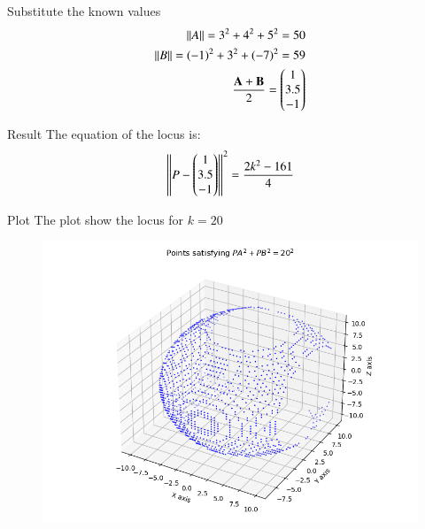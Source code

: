 \documentclass{beamer}
\begin{document}
\begin{frame}{Substitute the known values}
\begin{align}
    \left\lVert A\right\rVert=3^2+4^2+5^2=50 \\
    \left\lVert B\right\rVert=(-1)^2+3^2+(-7)^2=59 \\
    \frac{\mathbf{A}+\mathbf{B}}{2}=\begin{pmatrix}1 \\ 3.5 \\ -1\end{pmatrix}
\end{align}
\end{frame}

\begin{frame}{Result}
    The equation of the locus is:
\begin{align}
    \left\lVert P-\begin{pmatrix}1 \\ 3.5 \\ -1\end{pmatrix}\right\rVert^2=\frac{2k^2-161}{4}
\end{align}
\end{frame}

\begin{frame}{Plot}
    The plot show the locus for $k=20$

\begin{figure}[H]
    \centering
    \includegraphics[width=0.8\columnwidth]{figs/plot2_1.png}
    \caption{}
    \label{fig:plot}
\end{figure}
\end{frame}
\end{document}
